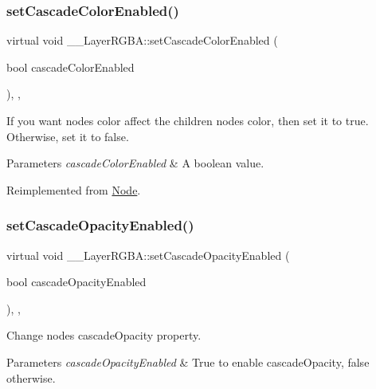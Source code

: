 \subsubsection{\texorpdfstring{set\+Cascade\+Color\+Enabled()}{setCascadeColorEnabled()}\hspace{0.1cm}{\footnotesize\ttfamily [2/2]}}
{\footnotesize\ttfamily virtual void \+\_\+\+\_\+\+Layer\+R\+G\+B\+A\+::set\+Cascade\+Color\+Enabled (\begin{DoxyParamCaption}\item[{bool}]{cascade\+Color\+Enabled }\end{DoxyParamCaption})\hspace{0.3cm}{\ttfamily [inline]}, {\ttfamily [override]}, {\ttfamily [virtual]}}

If you want node\textquotesingle{}s color affect the children node\textquotesingle{}s color, then set it to true. Otherwise, set it to false. 
\begin{DoxyParams}{Parameters}
{\em cascade\+Color\+Enabled} & A boolean value. \\
\hline
\end{DoxyParams}


Reimplemented from \hyperlink{classNode_a4e7f2dde1e3a7d56880f59f1480955e7}{Node}.

\mbox{\label{class____LayerRGBA_ab25a8418f19d14a064f8c8072b3468a5}} 
\subsubsection{\texorpdfstring{set\+Cascade\+Opacity\+Enabled()}{setCascadeOpacityEnabled()}\hspace{0.1cm}{\footnotesize\ttfamily [1/2]}}
{\footnotesize\ttfamily virtual void \+\_\+\+\_\+\+Layer\+R\+G\+B\+A\+::set\+Cascade\+Opacity\+Enabled (\begin{DoxyParamCaption}\item[{bool}]{cascade\+Opacity\+Enabled }\end{DoxyParamCaption})\hspace{0.3cm}{\ttfamily [inline]}, {\ttfamily [override]}, {\ttfamily [virtual]}}

Change node\textquotesingle{}s cascade\+Opacity property. 
\begin{DoxyParams}{Parameters}
{\em cascade\+Opacity\+Enabled} & True to enable cascade\+Opacity, false otherwise. \\
\hline
\end{DoxyParams}


